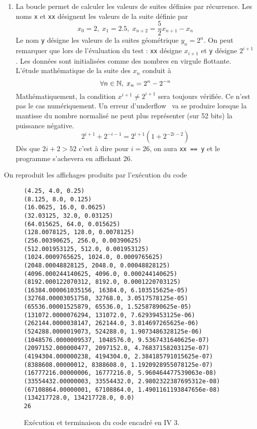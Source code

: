\begin{enumerate}
  \item La boucle permet de calculer les valeurs de suites définies par récurrence. Les noms \texttt{x} et \texttt{xx} désignent les valeurs de la suite définie par
\begin{displaymath}
x_0 = 2, \; x_1 = 2.5,\; x_{n+2} = \frac{5}{2} x_{n+1} - x_n   
\end{displaymath}
Le nom \texttt{y} désigne les valeurs de la suites géométrique $y_n = 2^n$.\newline
On peut remarquer que lors de l'évaluation du test : \texttt{xx} désigne $x_{i+1}$ et \texttt{y} désigne $2^{i+1}$.\newline
Les données sont initialisées comme des nombres en virgule flottante.\newline
L'étude mathématique de la suite des $x_n$ conduit à
\begin{displaymath}
  \forall n \in \mathbb{N},\; x_n = 2^{n} - 2^{-n}
\end{displaymath}
Mathématiquement, la condition $x^{i+1} \neq 2^{i+1}$ sera toujours vérifiée. Ce n'est pas le cas numériquement. Un erreur \og d'underflow\fg~ va se produire lorsque la mantisse du nombre normalisé ne peut plus représenter (sur 52 bits) la puissance négative.
\begin{displaymath}
  2^{i+1} + 2^{-i-1} = 2^{i+1}\left( 1 + 2^{-2i-2}\right) 
\end{displaymath}
Dès que $2i+2>52$ c'est à dire pour $i=26$, on aura \texttt{xx == y} et le programme s'achevera en affichant 26.
\end{enumerate}
On reproduit les affichages produits par l'exécution du code
\begin{figure}[htp]
  \centering
\begin{verbatim}
(4.25, 4.0, 0.25)
(8.125, 8.0, 0.125)
(16.0625, 16.0, 0.0625)
(32.03125, 32.0, 0.03125)
(64.015625, 64.0, 0.015625)
(128.0078125, 128.0, 0.0078125)
(256.00390625, 256.0, 0.00390625)
(512.001953125, 512.0, 0.001953125)
(1024.0009765625, 1024.0, 0.0009765625)
(2048.00048828125, 2048.0, 0.00048828125)
(4096.000244140625, 4096.0, 0.000244140625)
(8192.000122070312, 8192.0, 0.0001220703125)
(16384.000061035156, 16384.0, 6.103515625e-05)
(32768.00003051758, 32768.0, 3.0517578125e-05)
(65536.00001525879, 65536.0, 1.52587890625e-05)
(131072.0000076294, 131072.0, 7.62939453125e-06)
(262144.0000038147, 262144.0, 3.814697265625e-06)
(524288.0000019073, 524288.0, 1.9073486328125e-06)
(1048576.0000009537, 1048576.0, 9.5367431640625e-07)
(2097152.000000477, 2097152.0, 4.76837158203125e-07)
(4194304.000000238, 4194304.0, 2.384185791015625e-07)
(8388608.00000012, 8388608.0, 1.1920928955078125e-07)
(16777216.00000006, 16777216.0, 5.960464477539063e-08)
(33554432.00000003, 33554432.0, 2.9802322387695312e-08)
(67108864.00000001, 67108864.0, 1.4901161193847656e-08)
(134217728.0, 134217728.0, 0.0)
26
\end{verbatim}
\caption{Exécution et terminaison du code encadré en IV 3.}
\end{figure}

